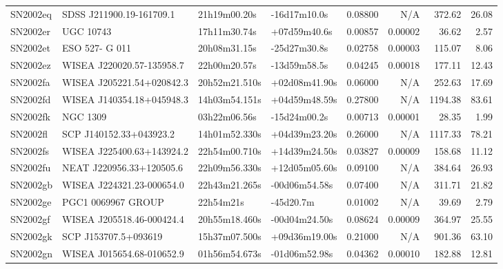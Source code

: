 \begin{longtable}{llllrrrr}
SN2002eq         &        SDSS J211900.19-161709.1 &    21h19m00.20s &    -16d17m10.0s &  0.08800 &      N/A &   372.62 &       26.08 \\
SN2002er         &                       UGC 10743 &    17h11m30.74s &    +07d59m40.6s &  0.00857 &  0.00002 &    36.62 &        2.57 \\
SN2002et         &                  ESO 527- G 011 &    20h08m31.15s &    -25d27m30.8s &  0.02758 &  0.00003 &   115.07 &        8.06 \\
SN2002ez         &       WISEA J220020.57-135958.7 &    22h00m20.57s &    -13d59m58.5s &  0.04245 &  0.00018 &   177.11 &       12.43 \\
SN2002fa         &       WISEA J205221.54+020842.3 &   20h52m21.510s &   +02d08m41.90s &  0.06000 &      N/A &   252.63 &       17.69 \\
SN2002fd         &       WISEA J140354.18+045948.3 &   14h03m54.151s &   +04d59m48.59s &  0.27800 &      N/A &  1194.38 &       83.61 \\
SN2002fk         &                        NGC 1309 &    03h22m06.56s &    -15d24m00.2s &  0.00713 &  0.00001 &    28.35 &        1.99 \\
SN2002fl         &         SCP J140152.33+043923.2 &   14h01m52.330s &   +04d39m23.20s &  0.26000 &      N/A &  1117.33 &       78.21 \\
SN2002fs         &       WISEA J225400.63+143924.2 &   22h54m00.710s &   +14d39m24.50s &  0.03827 &  0.00009 &   158.68 &       11.12 \\
SN2002fu         &        NEAT J220956.33+120505.6 &   22h09m56.330s &   +12d05m05.60s &  0.09100 &      N/A &   384.64 &       26.93 \\
SN2002gb         &       WISEA J224321.23-000654.0 &   22h43m21.265s &   -00d06m54.58s &  0.07400 &      N/A &   311.71 &       21.82 \\
SN2002ge         &              PGC1 0069967 GROUP &       22h54m21s &       -45d20.7m &  0.01002 &      N/A &    39.69 &        2.79 \\
SN2002gf         &       WISEA J205518.46-000424.4 &   20h55m18.460s &   -00d04m24.50s &  0.08624 &  0.00009 &   364.97 &       25.55 \\
SN2002gk         &            SCP J153707.5+093619 &   15h37m07.500s &   +09d36m19.00s &  0.21000 &      N/A &   901.36 &       63.10 \\
SN2002gn         &       WISEA J015654.68-010652.9 &   01h56m54.673s &   -01d06m52.98s &  0.04362 &  0.00010 &   182.88 &       12.81 \\

\end{longtable}
